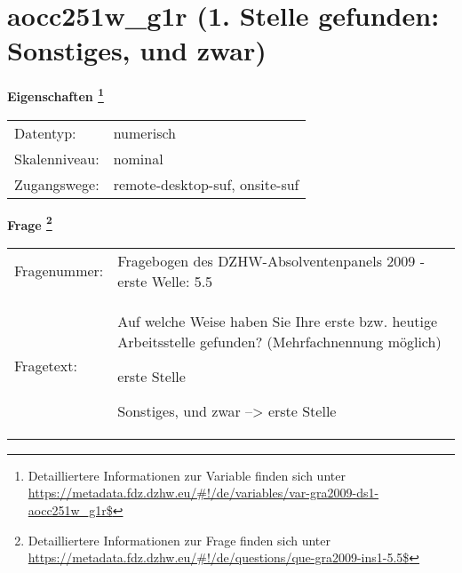 
    \setcounter{footnote}{0}

    \vspace*{-1.8cm}
	\section{aocc251w\_g1r (1. Stelle gefunden: Sonstiges, und zwar)}
	\label{section:aocc251w_g1r}



    \vspace*{0.5cm}
    \noindent\textbf{Eigenschaften
	\footnote{Detailliertere Informationen zur Variable finden sich unter
		\url{https://metadata.fdz.dzhw.eu/\#!/de/variables/var-gra2009-ds1-aocc251w_g1r$}}}\\
	\begin{tabularx}{\hsize}{@{}lX}
	Datentyp: & numerisch \\
	Skalenniveau: & nominal \\
	Zugangswege: &
	  remote-desktop-suf, 
	  onsite-suf
 \\
    \end{tabularx}



				\vspace*{0.5cm}
                \noindent\textbf{Frage
	                \footnote{Detailliertere Informationen zur Frage finden sich unter
		              \url{https://metadata.fdz.dzhw.eu/\#!/de/questions/que-gra2009-ins1-5.5$}}}\\
				\begin{tabularx}{\hsize}{@{}lX}
					Fragenummer: &
					  Fragebogen des DZHW-Absolventenpanels 2009 - erste Welle:
					  5.5
 \\
					Fragetext: & Auf welche Weise haben Sie Ihre erste bzw. heutige Arbeitsstelle gefunden? (Mehrfachnennung möglich)\par  erste Stelle\par  Sonstiges, und zwar --\textgreater{} erste Stelle \\
				\end{tabularx}





